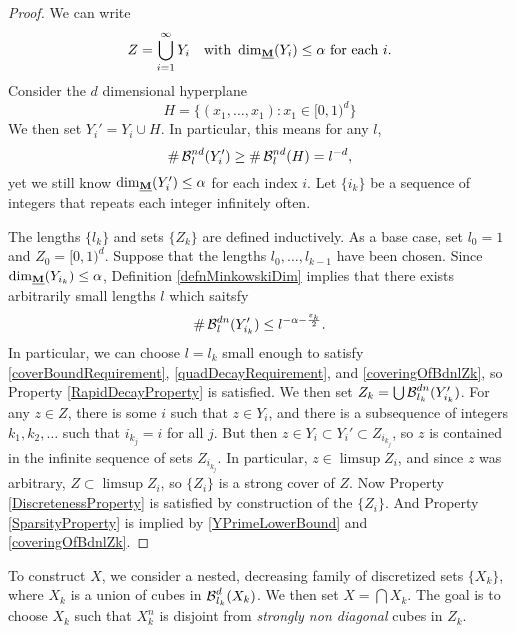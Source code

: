 \begin{proof}
	We can write
	\[ Z = \bigcup_{i = 1}^\infty Y_i \quad \text{with}\ \operatorname{\dim_{\underline{\mathbf{M}}}}(Y_i) \leq \alpha\ \text{for each $i$}. \]
	Consider the $d$ dimensional hyperplane
	\[ H = \{ (x_1,\dots, x_1) : x_1 \in [0,1)^d \} \]
	We then set $Y_i' = Y_i \cup H$. In particular, this means for any $l$,
	\begin{equation}\label{YPrimeLowerBound}
		\# \operatorname{\mathcal{B}}^{nd}_l(Y_i') \geq \# \operatorname{\mathcal{B}}^{nd}_l(H) = l^{-d},
	\end{equation}
	yet we still know $\operatorname{\dim_{\underline{\mathbf{M}}}}(Y_i') \leq \alpha$ for each index $i$. Let $\{ i_k \}$ be a sequence of integers that repeats each integer infinitely often.

	The lengths $\{ l_k \}$ and sets $\{ Z_k \}$ are defined inductively. As a base case, set $l_0 = 1$ and $Z_0 = [0,1)^d$. Suppose that the lengths $l_0, \ldots, l_{k-1}$ have been chosen. Since $\operatorname{\dim_{\underline{\mathbf{M}}}}(Y_{i_k}) \leq \alpha$, Definition \ref{defnMinkowskiDim} implies that there exists arbitrarily small lengths $l$ which saitsfy
	\begin{equation}\label{coveringOfBdnlZk}
		\# \operatorname{\mathcal{B}}^{dn}_l(Y_{i_k}') \leq l^{-\alpha - \frac{\varepsilon_k}{2}}.
	\end{equation}
	In particular, we can choose $l = l_k$ small enough to satisfy \eqref{coverBoundRequirement}, \eqref{quadDecayRequirement}, and \eqref{coveringOfBdnlZk}, so Property \ref{RapidDecayProperty} is satisfied. We then set $Z_k = \bigcup \operatorname{\mathcal{B}}^{dn}_{l_k}(Y_{i_k}')$. For any $z \in Z$, there is some $i$ such that $z \in Y_i$, and there is a subsequence of integers $k_1, k_2, \dots$ such that $i_{k_j} = i$ for all $j$. But then $z \in Y_i \subset Y_i' \subset Z_{i_{k_j}}$, so $z$ is contained in the infinite sequence of sets $Z_{i_{k_j}}$. In particular, $z \in \limsup Z_i$, and since $z$ was arbitrary, $Z \subset \limsup Z_i$, so $\{ Z_i \}$ is a strong cover of $Z$. Now Property \ref{DiscretenessProperty} is satisfied by construction of the $\{ Z_i \}$. And Property \ref{SparsityProperty} is implied by \eqref{YPrimeLowerBound} and \eqref{coveringOfBdnlZk}.
\end{proof}

To construct $X$, we consider a nested, decreasing family of discretized sets $\{ X_k \}$, where $X_k$ is a union of cubes in $\operatorname{\mathcal{B}}^d_{l_k}(X_k)$. We then set $X = \bigcap X_k$. The goal is to choose $X_k$ such that $X_k^n$ is disjoint from {\it strongly non diagonal} cubes in $Z_k$.

